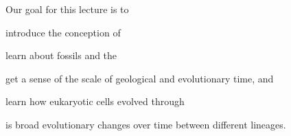 \documentclass[t]{beamer}
\begin{document}
\begin{frame}{Our goal for this lecture is to}

	\hangpara introduce the conception of 
	
	\hangpara learn about fossils and the 
	
	\hangpara get a sense of the scale of geological and evolutionary time, and
	
	\hangpara learn how eukaryotic cells evolved through 
	

\end{frame}
%

{
\begin{frame}{ is broad evolutionary changes over time between different lineages.}
\end{frame}
}
\end{document}
